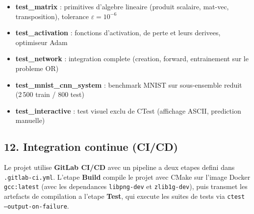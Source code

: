\documentclass[
  letterpaper,
  DIV=11,
  numbers=noendperiod]{scrartcl}
\providecommand{\tightlist}{%
  \setlength{\itemsep}{0pt}\setlength{\parskip}{0pt}}
\begin{document}
\begin{itemize}
\tightlist
\item \textbf{test\_matrix} : primitives d'algebre lineaire (produit scalaire, mat-vec, transposition), tolerance \(\varepsilon = 10^{-6}\)
\item \textbf{test\_activation} : fonctions d'activation, de perte et leurs derivees, optimiseur Adam
\item \textbf{test\_network} : integration complete (creation, forward, entrainement sur le probleme OR)
\item \textbf{test\_mnist\_cnn\_system} : benchmark MNIST sur sous-ensemble reduit (2\,500 train / 800 test)
\item \textbf{test\_interactive} : test visuel exclu de CTest (affichage ASCII, prediction manuelle)
\end{itemize}

\subsection{12. Integration continue (CI/CD)}\label{cicd}

Le projet utilise \textbf{GitLab CI/CD} avec un pipeline a deux etapes defini dans \texttt{.gitlab-ci.yml}. L'etape \textbf{Build} compile le projet avec CMake sur l'image Docker \texttt{gcc:latest} (avec les dependances \texttt{libpng-dev} et \texttt{zlib1g-dev}), puis transmet les artefacts de compilation a l'etape \textbf{Test}, qui execute les suites de tests via \texttt{ctest --output-on-failure}.

\begin{center}
\end{center}
\end{document}
